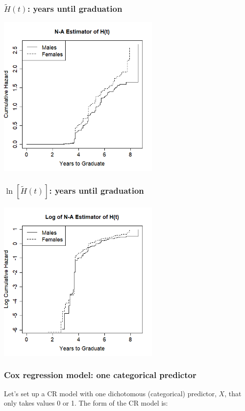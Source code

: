 \begin{frame}
\frametitle{$\tilde{H}(t)$: years until graduation}
\includegraphics[width=0.6\textwidth]{Figures/KM_cumhaz_surv.png}
\end{frame}

\begin{frame}
\frametitle{$\ln[\tilde{H}(t)]$: years until graduation}
\includegraphics[width=0.6\textwidth]{Figures/KM_logcumhaz_surv.png}
\end{frame}


\begin{frame}
\frametitle{Cox regression model: one categorical predictor}
Let's set up a CR model with one dichotomous (categorical) predictor, $X$, that only takes values 0 or 1.  The form of the CR model is:
\vskip200pt
\end{frame}


